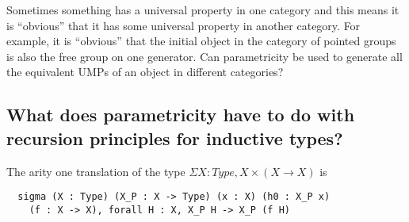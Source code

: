 \documentclass[12pt]{article} %
\theoremstyle{definition}
\theoremstyle{definition}
\theoremstyle{definition}
\theoremstyle{definition}
\begin{document}
Sometimes something has a universal property in one category and this means it is ``obvious'' that 
it has some universal property in another category. For example, it is ``obvious'' that the initial
object in the category of pointed groups is also the free group on one generator. Can parametricity be used 
to generate all the equivalent UMPs of an object in different categories?

\subsection {What does parametricity have to do with recursion principles for inductive types?}

The arity one translation of the type $\Sigma X : Type, X \times (X \rightarrow X)$ is 
\begin{lstlisting}
  sigma (X : Type) (X_P : X -> Type) (x : X) (h0 : X_P x) 
    (f : X -> X), forall H : X, X_P H -> X_P (f H)
\end{lstlisting}





\end{document}
